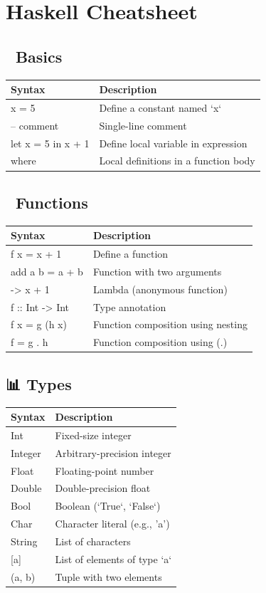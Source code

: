 \documentclass[11pt]{article}
\author{B. Orçun Özkablan}
\date{\today}
\title{}
\begin{document}
\tableofcontents

\section{Haskell Cheatsheet}
\label{sec:orgd5fb38c}

\subsection{🧱 Basics}
\label{sec:org897e40f}
\begin{center}
\begin{tabular}{ll}
Syntax & Description\\
\hline
x = 5 & Define a constant named `x`\\
-- comment & Single-line comment\\
let x = 5 in x + 1 & Define local variable in expression\\
where & Local definitions in a function body\\
\end{tabular}
\end{center}
\subsection{🧮 Functions}
\label{sec:orge90e753}
\begin{center}
\begin{tabular}{ll}
Syntax & Description\\
\hline
f x = x + 1 & Define a function\\
add a b = a + b & Function with two arguments\\
\x -> x + 1 & Lambda (anonymous function)\\
f :: Int -> Int & Type annotation\\
f x = g (h x) & Function composition using nesting\\
f = g . h & Function composition using (.)\\
\end{tabular}
\end{center}
\subsection{📊 Types}
\label{sec:orgd5739a9}
\begin{center}
\begin{tabular}{ll}
Syntax & Description\\
\hline
Int & Fixed-size integer\\
Integer & Arbitrary-precision integer\\
Float & Floating-point number\\
Double & Double-precision float\\
Bool & Boolean (`True`, `False`)\\
Char & Character literal (e.g., 'a')\\
String & List of characters\\
{[}a] & List of elements of type `a`\\
(a, b) & Tuple with two elements\\
\end{tabular}
\end{center}
\end{document}

